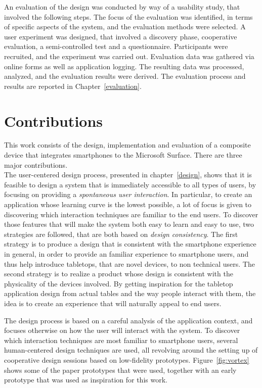An evaluation of the design was conducted by way of a usability study, that involved the following steps.
The focus of the evaluation was identified, in terms of specific aspects of the system, and the evaluation methods were selected.
A user experiment was designed, that involved a discovery phase, cooperative evaluation, a semi-controlled test and a questionnaire.
Participants were recruited, and the experiment was carried out.
Evaluation data was gathered via online forms as well as application logging.
The resulting data was processed, analyzed, and the evaluation results were derived.
The evaluation process and results are reported in Chapter~\ref{evaluation}.

\section{Contributions}

This work consists of the design, implementation and evaluation of a composite device that integrates smartphones to the Microsoft Surface.
There are three major contributions.
\\
\linebreak
The user-centered design process, presented in chapter~\ref{design}, shows that it is feasible to design a system that is immediately accessible to all types of users, by focusing on providing a \emph{spontaneous user interaction}.
In particular, to create an application whose learning curve is the lowest possible, a lot of focus is given to discovering which interaction techniques are familiar to the end users.
To discover those features that will make the system both easy to learn and easy to use, two strategies are followed, that are both based on \emph{design consistency}.
The first strategy is to produce a design that is consistent with the smartphone experience in general, in order to provide an familiar experience to smartphone users, and thus help introduce tabletops, that are novel devices, to non technical users.
The second strategy is to realize a product whose design is consistent with the physicality of the devices involved.
By getting inspiration for the tabletop application design from actual tables and the way people interact with them, the idea is to create an experience that will naturally appeal to end users. 

The design process is based on a careful analysis of the application context, and focuses otherwise on how the user will interact with the system.
To discover which interaction techniques are most familiar to smartphone users, several human-centered design techniques are used, all revolving around the setting up of cooperative design sessions based on low-fidelity prototypes.
Figure~\ref{fig:vortex} shows some of the paper prototypes that were used, together with an early prototype that was used as inspiration for this work.

